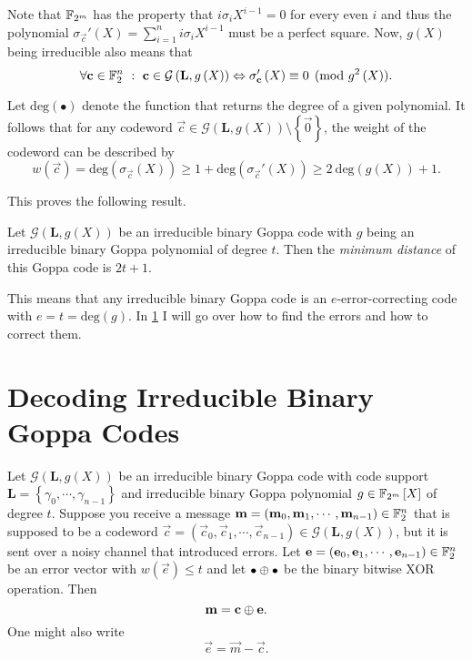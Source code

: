 Note that $\mathbb{F}_{2^m}$ has the property that $i \sigma_i X^{i-1} = 0$ for every even $i$ and thus the polynomial $\sigma_{\vec{c}}'\left(X\right) = \sum_{i = 1}^{n} i \sigma_i X^{i-1}$ must be a perfect square. Now, $g\left(X\right)$ being irreducible also means that
\[
	\forall \boldsymbol{\mathrm{c}} \in \mathbb{F}_{2}^n \ : \ \boldsymbol{\mathrm{c}} \in \mathcal{G}\left(\mathbf{L}, g\left(X\right)\right) \Leftrightarrow \sigma_{\boldsymbol{\mathrm{c}}}'\left(X\right) \equiv 0 \pmod {g^2\left(X\right)}.
\]

Let $\mathrm{deg}\left(\bullet\right)$ denote the function that returns the degree of a given polynomial. It follows that for any codeword $\vec{c} \in \mathcal{G}\left(\mathbf{L},g\left(X\right)\right) \setminus \left\{ \vec{0} \right\}$, the weight of the codeword can be described by
\[
	w\left(\vec{c}\right) = \mathrm{deg}\left(\sigma_{\vec{c}}\left(X\right)\right) \geq 1 + \mathrm{deg}\left(\sigma_{\vec{c}}'\left(X\right)\right) \geq 2 \ \mathrm{deg}\left(g\left(X\right)\right) + 1.
\]

This proves the following result.
\begin{thm}
	Let	$\mathcal{G}\left(\mathbf{L},g\left(X\right)\right)$ be an irreducible binary Goppa code with $g$ being an irreducible binary Goppa polynomial of degree $t$. Then the \emph{minimum distance} of this Goppa code is $2t + 1$.
\end{thm}
This means that any irreducible binary Goppa code is an $e$-error-correcting code with $e = t = \mathrm{deg}\left(g\right)$. In \cref{sec:decGoppa} I will go over how to find the errors and how to correct them.



\section{Decoding Irreducible Binary Goppa Codes}
\label{sec:decGoppa}

Let $\mathcal{G}\left(\mathbf{L},g\left(X\right)\right)$ be an irreducible binary Goppa code with code support $\mathbf{L} = \left\{ \gamma_0, \cdots, \gamma_{n-1} \right\}$ and irreducible binary Goppa polynomial $g \in \mathbb{F}_{2^m}\left[X\right]$ of degree $t$. Suppose you receive a message $\boldsymbol{\mathrm{m}} = \left(\boldsymbol{\mathrm{m}}_0, \boldsymbol{\mathrm{m}}_1, \cdots, \boldsymbol{\mathrm{m}}_{n-1}\right) \in \mathbb{F}_2^n$ that is supposed to be a codeword $\vec{c} = \left(\vec{c}_0, \vec{c}_1, \cdots, \vec{c}_{n-1}\right) \in \mathcal{G}\left(\mathbf{L},g\left(X\right)\right)$, but it is sent over a noisy channel that introduced errors. Let $\boldsymbol{\mathrm{e}} = \left(\boldsymbol{\mathrm{e}}_0, \boldsymbol{\mathrm{e}}_1, \cdots, \boldsymbol{\mathrm{e}}_{n-1}\right) \in \mathbb{F}_2^n$ be an error vector with $w\left(\vec{e}\right) \leq t$ and let $\bullet \mathbin{\oplus} \bullet$ be the binary bitwise XOR operation. Then
\[	
	\boldsymbol{\mathrm{m}} = \boldsymbol{\mathrm{c}} \mathbin{\oplus} \boldsymbol{\mathrm{e}}.
\]
One might also write
\[
	\vec{e} = \vec{m} - \vec{c}.
\]

